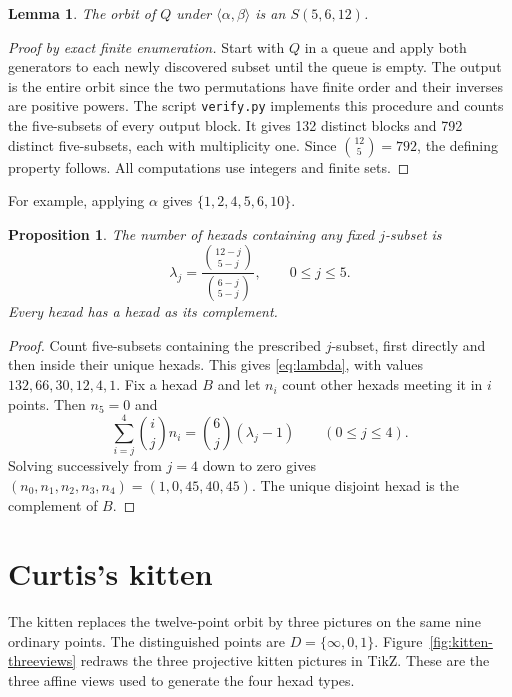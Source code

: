 \documentclass[12pt,letterpaper]{article}
\newtheorem{proposition}[theorem]{Proposition}
\newtheorem{lemma}[theorem]{Lemma}
\theoremstyle{definition}\newtheorem{example}[theorem]{Example}
\numberwithin{equation}{section}
\begin{document}
\begin{lemma}\label{lem:orbit}
The orbit of $Q$ under $\langle\alpha,\beta\rangle$ is an $S(5,6,12)$.
\end{lemma}

\begin{proof}[Proof by exact finite enumeration]
Start with $Q$ in a queue and apply both generators to each newly discovered subset until the queue is empty. The output is the entire orbit since the two permutations have finite order and their inverses are positive powers. The script \texttt{verify.py} implements this procedure and counts the five-subsets of every output block. It gives 132 distinct blocks and 792 distinct five-subsets, each with multiplicity one. Since $\binom{12}{5}=792$, the defining property follows. All computations use integers and finite sets.
\end{proof}

For example, applying $\alpha$ gives $\{1,2,4,5,6,10\}$.

\begin{proposition}\label{prop:parameters}
The number of hexads containing any fixed $j$-subset is
\begin{equation}\label{eq:lambda}
\lambda_j=\frac{\binom{12-j}{5-j}}{\binom{6-j}{5-j}},\qquad 0\le j\le5.
\end{equation}
Every hexad has a hexad as its complement.
\end{proposition}

\begin{proof}
Count five-subsets containing the prescribed $j$-subset, first directly and then inside their unique hexads. This gives \eqref{eq:lambda}, with values $132,66,30,12,4,1$. Fix a hexad $B$ and let $n_i$ count other hexads meeting it in $i$ points. Then $n_5=0$ and
\[
\sum_{i=j}^4\binom{i}{j}n_i=\binom{6}{j}(\lambda_j-1)\qquad(0\le j\le4).
\]
Solving successively from $j=4$ down to zero gives $(n_0,n_1,n_2,n_3,n_4)=(1,0,45,40,45)$. The unique disjoint hexad is the complement of $B$.
\end{proof}

\section{Curtis's kitten}\label{sec:kitten}
The kitten replaces the twelve-point orbit by three pictures on the same nine ordinary points. The distinguished points are $D=\{\infty,0,1\}$. Figure~\ref{fig:kitten-threeviews} redraws the three projective kitten pictures in TikZ. These are the three affine views used to generate the four hexad types.
\end{document}
